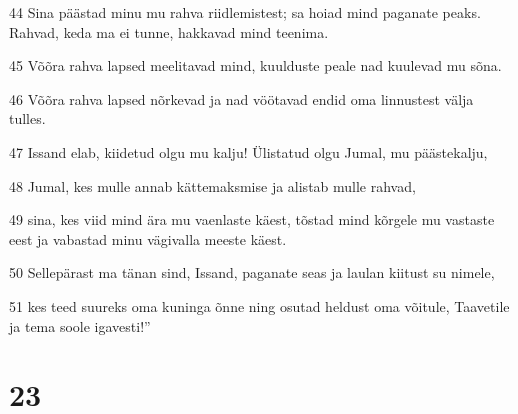 \par 44 Sina päästad minu mu rahva riidlemistest; sa hoiad mind paganate peaks. Rahvad, keda ma ei tunne, hakkavad mind teenima.
\par 45 Võõra rahva lapsed meelitavad mind, kuulduste peale nad kuulevad mu sõna.
\par 46 Võõra rahva lapsed nõrkevad ja nad vöötavad endid oma linnustest välja tulles.
\par 47 Issand elab, kiidetud olgu mu kalju! Ülistatud olgu Jumal, mu päästekalju,
\par 48 Jumal, kes mulle annab kättemaksmise ja alistab mulle rahvad,
\par 49 sina, kes viid mind ära mu vaenlaste käest, tõstad mind kõrgele mu vastaste eest ja vabastad minu vägivalla meeste käest.
\par 50 Sellepärast ma tänan sind, Issand, paganate seas ja laulan kiitust su nimele,
\par 51 kes teed suureks oma kuninga õnne ning osutad heldust oma võitule, Taavetile ja tema soole igavesti!”

\chapter{23}

